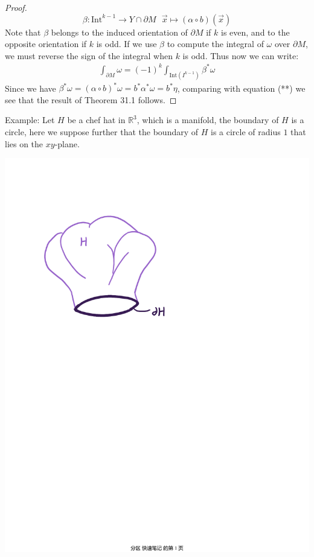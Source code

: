 \documentclass[15pt]{book}
\theoremstyle{break}
\theoremstyle{break}
\newcommand{\R}{\mathbb{R}}
\newcommand{\Int}{\text{Int}}
\newcommand{\example}{\color{green}Example: \color{black}}
\begin{document}
\begin{proof}
$$\beta: \Int^{k-1}\to Y \cap \partial M \ \ \ \vec{x}\mapsto (\alpha\circ b)(\vec{x})$$ 
Note that $\beta$ belongs to the induced orientation of $\partial M$ if $k$ is even, and to the opposite orientation if $k$ is odd. If we use $\beta$ to compute the integral of $\omega$ over $\partial M$, we must reverse the sign of the integral when $k$ is odd. Thus now we can write:
\begin{align*}
\int_{\partial M} \omega = (-1)^k \int_{\Int(I^{k-1})} \beta^*\omega
\end{align*}
Since we have $\beta^*\omega = (\alpha \circ b)^* \omega = b^*\alpha^*\omega = b^*\eta$, comparing with equation (**) we see that the result of Theorem 31.1 follows.
\end{proof}


\example
Let $H$ be a chef hat in $\R^3$, which is a manifold, the boundary of $H$ is a circle, here we suppose further that the boundary of $H$ is a circle of radius $1$ that lies on the $xy$-plane.\\ 
\begin{center}
\includegraphics[scale=0.65]{chef-hat.pdf}
\end{center}
\end{document}
